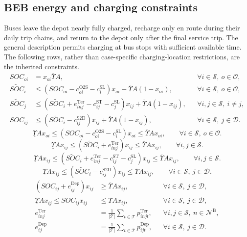 \documentclass{article}
\begin{document}
\subsection*{BEB energy and charging constraints}
Buses leave the depot nearly fully charged, recharge only en route during their daily trip chains, and return to the depot only after the final service trip. The general description permits charging at bus stops with sufficient available time. The following rows, rather than case-specific charging-location restrictions, are the inherited constraints.
\begin{align}
SOC_{oi}&=x_{oi}\overline\Upsilon A,
&&\forall i\in\mathcal S,\ o\in\mathcal O,\tag{10}\\
\widetilde{SOC}_i&\leq
(SOC_{oi}-c^{\mathrm{O2S}}_{oi}-c^{\mathrm{SL}}_i)x_{oi}
+\overline\Upsilon A(1-x_{oi}),
&&\forall i\in\mathcal S,\ o\in\mathcal O,\tag{11}\\
\widetilde{SOC}_j&\leq
(\widetilde{SOC}_i+e^{\mathrm{Ter}}_{inj}-c^{\mathrm{ST}}_{ij}-c^{\mathrm{SL}}_j)x_{ij}
+\overline\Upsilon A(1-x_{ij}),
&&\forall i,j\in\mathcal S,\ i\ne j,\tag{12}\\
SOC_{ij}&\leq
(\widetilde{SOC}_i-c^{\mathrm{S2D}}_{ij})x_{ij}
+\overline\Upsilon A(1-x_{ij}),
&&\forall i\in\mathcal S,\ j\in\mathcal D.\tag{13}
\end{align}
\begin{equation}
\underline\Upsilon Ax_{oi}\leq
(SOC_{oi}-c^{\mathrm{O2S}}_{oi}-c^{\mathrm{SL}}_i)x_{oi}
\leq\overline\Upsilon Ax_{oi},
\qquad\forall i\in\mathcal S,\ o\in\mathcal O.
\tag{14}
\end{equation}
\begin{equation}
\underline\Upsilon Ax_{ij}\leq
(\widetilde{SOC}_i+e^{\mathrm{Ter}}_{inj})x_{ij}
\leq\overline\Upsilon Ax_{ij},
\qquad\forall i,j\in\mathcal S.
\tag{15}
\end{equation}
\begin{equation}
\underline\Upsilon Ax_{ij}\leq
(\widetilde{SOC}_i+e^{\mathrm{Ter}}_{inj}-c^{\mathrm{ST}}_{ij}-c^{\mathrm{SL}}_j)x_{ij}
\leq\overline\Upsilon Ax_{ij},
\qquad\forall i,j\in\mathcal S.
\tag{16}
\end{equation}
\begin{equation}
\underline\Upsilon Ax_{ij}\leq
(\widetilde{SOC}_i-c^{\mathrm{S2D}}_{ij})x_{ij}
\leq\overline\Upsilon Ax_{ij},
\qquad\forall i\in\mathcal S,\ j\in\mathcal D.
\tag{17}
\end{equation}
\begin{align}
(SOC_{ij}+e^{\mathrm{Dep}}_{ij})x_{ij}&\geq\overline\Upsilon Ax_{ij},
&&\forall i\in\mathcal S,\ j\in\mathcal D,\tag{18}\\
\underline\Upsilon Ax_{ij}\leq SOC_{ij}x_{ij}&\leq\overline\Upsilon Ax_{ij},
&&\forall i\in\mathcal S,\ j\in\mathcal D,\tag{19}\\
e^{\mathrm{Ter}}_{inj}&=\frac{1}{|\mathcal T|}\sum_{t\in\mathcal T}p^{\mathrm{Ter}}_{injt},
&&\forall i,j\in\mathcal S,\ n\in\mathcal N^{\mathrm B},\tag{20}\\
e^{\mathrm{Dep}}_{ij}&=\frac{1}{|\mathcal T|}\sum_{t\in\mathcal T}p^{\mathrm{Dep}}_{ijt},
&&\forall i\in\mathcal S,\ j\in\mathcal D.\tag{21}
\end{align}
\end{document}
